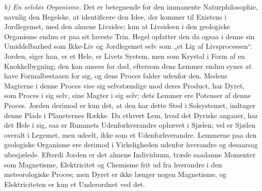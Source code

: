 \documentclass[12pt,a4paper]{book}
\newcommand{\runin}[1]{\emph{#1}\hspace{0.4em}}
\begin{document}
\runin{b) En selvløs Organisme.} Det er betegnende for den immanente
Naturphilosophie, navnlig den Hegelske, at identificere den Idee, der kommer
til Existens i Jordlegemet, med den almene Livsidee; kun at Livsideen i den
geologiske Organisme endnu er paa sit laveste Trin. Hegel opfatter den da ogsaa
i denne sin Umiddelbarhed som Ikke-Liv og Jordlegemet selv som „et Lig af
Livsprocessen“. Jorden, siger han, er et Hele, er Livets System, men som
Krystal i Form af en Knokkelbygning; den kan ansees for død, eftersom dens
Lemmer endnu synes at have Formalbestaaen for sig, og dens Proces falder
udenfor den. Medens Magterne i denne Proces vise sig selvstændige mod deres
Product, har Dyret, som Proces i sig selv, sine Magter i sig selv; dets Lemmer
ere Potenser af denne Proces. Jorden derimod er kun det, at den har dette Sted
i Solsystemet, indtager denne Plads i Planeternes Række. Da ethvert Lem, hvad
det Dyriske angaaer, har det Hele i sig, saa er
Rummets Udenforhverandre ophævet i Sjælen; vel er Sjælen overalt i Legemet, men
udeelt, ikke som et Udenforhverandre. Lemmerne paa den geologiske Organisme ere
derimod i Virkeligheden udenfor hverandre og desaarsag ubesjælede. Efterdi
Jorden er det almene Individuum, træde saadanne Momenter som Magnetisme,
Elektricitet og Chemisme frit ud fra hverandre i den meteorologiske Proces; men
Dyret er ikke længer nogen Magnetisme, og Elektriciteten er kun et Underordnet
ved det.
\end{document}
